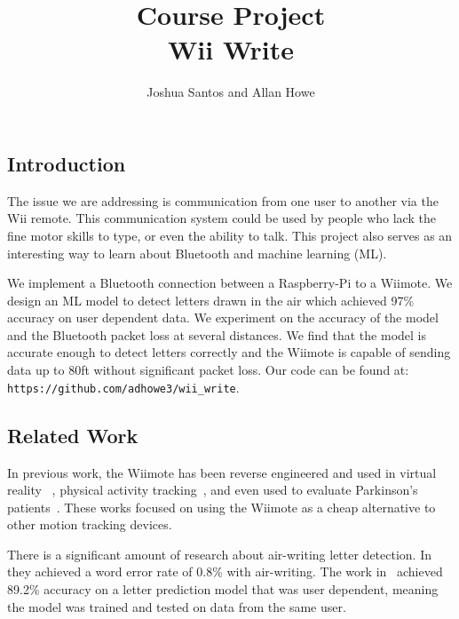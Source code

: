 \documentclass[letterpaper,twocolumn,10pt]{article}
\title{Course Project\\
Wii Write}
\author{Joshua Santos and Allan Howe}
\begin{document}
\maketitle

\subsection*{Introduction}
The issue we are addressing is communication from one user to another via the Wii remote. This communication system could be used by people who lack the fine motor skills to type, or even the ability to talk. This project also serves as an interesting way to learn about Bluetooth and machine learning (ML).

We implement a Bluetooth connection between a Raspberry-Pi to a Wiimote. We design an ML model to detect letters drawn in the air which achieved 97\% accuracy on user dependent data. We experiment on the accuracy of the model and the Bluetooth packet loss at several distances. We find that the model is accurate enough to detect letters correctly and the Wiimote is capable of sending data up to 80ft without significant packet loss. Our code can be found at: \texttt{https://github.com/adhowe3/wii\_write}.

\subsection*{Related Work}
In previous work, the Wiimote has been reverse engineered and used in virtual reality~\cite{leeHacking} , physical activity tracking~\cite{Khan2013WiiActivity}, and even used to evaluate Parkinson's patients~\cite{SynnottWiiPD}. These works focused on using the Wiimote as a cheap alternative to other motion tracking devices.

There is a significant amount of research about air-writing letter detection. In~\cite{ChenAirWriting} they achieved a word error rate of 0.8\% with air-writing. The work in~\cite{YanayAirwriting} achieved 89.2\% accuracy on a letter prediction model that was user dependent, meaning the model was trained and tested on data from the same user.
\end{document}
